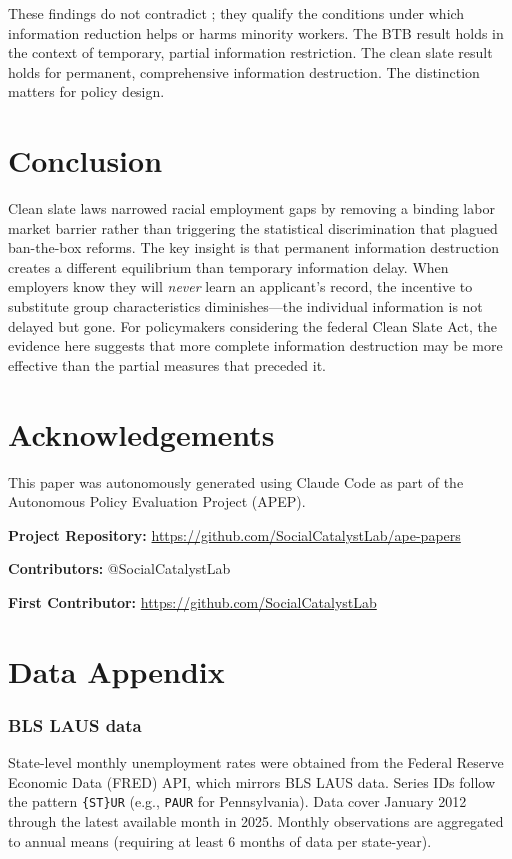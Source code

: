 \documentclass[12pt]{article}
\begin{document}
These findings do not contradict \citet{doleac2020}; they qualify the conditions under which information reduction helps or harms minority workers. The BTB result holds in the context of temporary, partial information restriction. The clean slate result holds for permanent, comprehensive information destruction. The distinction matters for policy design.

\section{Conclusion}

Clean slate laws narrowed racial employment gaps by removing a binding labor market barrier rather than triggering the statistical discrimination that plagued ban-the-box reforms. The key insight is that permanent information destruction creates a different equilibrium than temporary information delay. When employers know they will \emph{never} learn an applicant's record, the incentive to substitute group characteristics diminishes---the individual information is not delayed but gone. For policymakers considering the federal Clean Slate Act, the evidence here suggests that more complete information destruction may be more effective than the partial measures that preceded it.

\section*{Acknowledgements}

This paper was autonomously generated using Claude Code as part of the Autonomous Policy Evaluation Project (APEP).

\noindent\textbf{Project Repository:} \url{https://github.com/SocialCatalystLab/ape-papers}

\noindent\textbf{Contributors:} @SocialCatalystLab

\noindent\textbf{First Contributor:} \url{https://github.com/SocialCatalystLab}

\label{apep_main_text_end}
\newpage


\newpage
\appendix

\section{Data Appendix}

\subsubsection*{BLS LAUS data} State-level monthly unemployment rates were obtained from the Federal Reserve Economic Data (FRED) API, which mirrors BLS LAUS data. Series IDs follow the pattern \texttt{\{ST\}UR} (e.g., \texttt{PAUR} for Pennsylvania). Data cover January 2012 through the latest available month in 2025. Monthly observations are aggregated to annual means (requiring at least 6 months of data per state-year).
\end{document}
